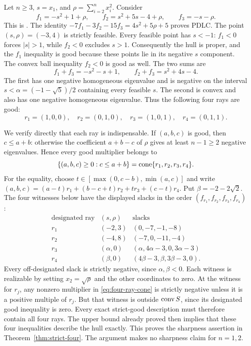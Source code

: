 \begin{example}
\label{ex:four-sharp}
Let $n\geq3$, $s=x_1$, and $\rho=\sum_{i=2}^n x_i^2$. Consider
\begin{equation}\label{eq:four-sharp-system}
 f_1=-s^2+1+\rho,\qquad
 f_2=s^2+5s-4+\rho,\qquad f_3=-s-\rho.
\end{equation}
This is \citet[Example~2.21]{BDSpreprint}. The identity
$-7f_1-3f_2-15f_3=4s^2+5\rho+5$ proves PDLC.
The point $(s,\rho)=(-3,4)$ is strictly feasible. Every feasible point
has $s<-1$: $f_1<0$ forces $|s|>1$, while $f_2<0$ excludes $s>1$.
Consequently the hull is proper, and the $f_1$ inequality is good because
these points lie in its negative $s$ component. The convex ball inequality
$f_2<0$ is good as well. The two sums are
\[
 f_1+f_3=-s^2-s+1,
 \qquad f_2+f_3=s^2+4s-4.
\]
The first has one negative homogeneous eigenvalue and is negative on
the interval $s<\alpha=(-1-\sqrt5)/2$ containing every feasible $s$.
The second is convex and also has one negative homogeneous eigenvalue.
Thus the following four rays are good:
\[
 r_1=(1,0,0),\quad r_2=(0,1,0),\quad
 r_3=(1,0,1),\quad r_4=(0,1,1).
\]

We verify directly that each ray is indispensable. If $(a,b,c)$ is good,
then $c\leq a+b$: otherwise the coefficient $a+b-c$ of $\rho$ gives
at least $n-1\geq2$ negative eigenvalues. Hence every good multiplier
belongs to
\begin{equation}\label{eq:four-ray-cone}
 \{(a,b,c)\geq0:c\leq a+b\}=\operatorname{cone}\{r_1,r_2,r_3,r_4\}.
\end{equation}
For the equality, choose $t\in[\max(0,c-b),\min(a,c)]$ and write
$(a,b,c)=(a-t)r_1+(b-c+t)r_2+tr_3+(c-t)r_4$.
Put $\beta=-2-2\sqrt2$. The four witnesses below have the displayed
slacks in the order $(f_{r_1},f_{r_2},f_{r_3},f_{r_4})$:
\[
\begin{array}{c|c|c}
 \text{designated ray}&(s,\rho)&\text{slacks}\\\hline
 r_1&(-2,3)&(0,-7,-1,-8)\\
 r_2&(-4,8)&(-7,0,-11,-4)\\
 r_3&(\alpha,0)&(\alpha,4\alpha-3,0,3\alpha-3)\\
 r_4&(\beta,0)&(4\beta-3,\beta,3\beta-3,0).
\end{array}
\]
Every off-designated slack is strictly negative, since $\alpha,\beta<0$.
Each witness is realizable by setting $x_2=\sqrt\rho$ and the other
coordinates to zero. At the witness for $r_j$, any nonzero multiplier in
\eqref{eq:four-ray-cone} is strictly negative unless it is a positive
multiple of $r_j$. But that witness is outside $\operatorname{conv} S$, since its
designated good inequality is zero. Every exact strict-good description
must therefore contain all four rays. The upper bound already proved
then implies that these four inequalities describe the hull exactly.
This proves the sharpness assertion in Theorem~\ref{thm:strict-four}.
The argument makes no sharpness claim for $n=1,2$.
\end{example}

